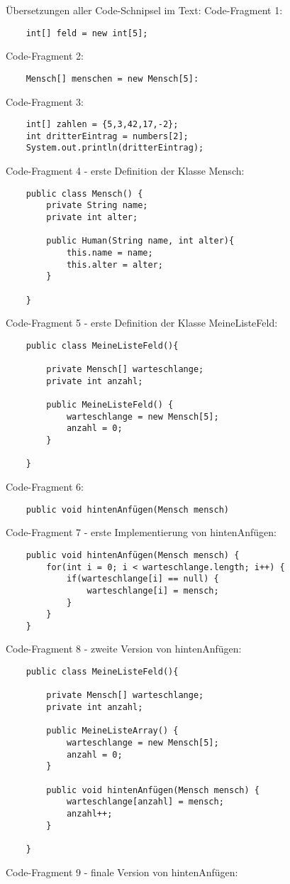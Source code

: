 \documentclass{article}
\begin{document}
Übersetzungen aller Code-Schnipsel im Text:
Code-Fragment 1:
\begin{verbatim}
    int[] feld = new int[5];
\end{verbatim}
Code-Fragment 2:
\begin{verbatim}
    Mensch[] menschen = new Mensch[5]:
\end{verbatim}
Code-Fragment 3:
\begin{verbatim}
    int[] zahlen = {5,3,42,17,-2};
    int dritterEintrag = numbers[2];
    System.out.println(dritterEintrag);
\end{verbatim}
Code-Fragment 4 - erste Definition der Klasse Mensch:
\begin{verbatim}
    public class Mensch() {
        private String name;
        private int alter; 
    
        public Human(String name, int alter){
            this.name = name;
            this.alter = alter;
        }
    
    }
\end{verbatim}
Code-Fragment 5 - erste Definition der Klasse MeineListeFeld:
\begin{verbatim}
    public class MeineListeFeld(){

        private Mensch[] warteschlange;
        private int anzahl;

        public MeineListeFeld() {
            warteschlange = new Mensch[5];
            anzahl = 0;
        }

    }
\end{verbatim}
Code-Fragment 6:
\begin{verbatim}
    public void hintenAnfügen(Mensch mensch) 
\end{verbatim}
Code-Fragment 7 - erste Implementierung von hintenAnfügen:
\begin{verbatim}
    public void hintenAnfügen(Mensch mensch) {
        for(int i = 0; i < warteschlange.length; i++) {
            if(warteschlange[i] == null) {
                warteschlange[i] = mensch;
            }
        }
    }
\end{verbatim}
Code-Fragment 8 - zweite Version von hintenAnfügen:
\begin{verbatim}
    public class MeineListeFeld(){

        private Mensch[] warteschlange;
        private int anzahl; 

        public MeineListeArray() {
            warteschlange = new Mensch[5];
            anzahl = 0;
        }

        public void hintenAnfügen(Mensch mensch) {
            warteschlange[anzahl] = mensch;
            anzahl++;
        }

    }
\end{verbatim}
Code-Fragment 9 - finale Version von hintenAnfügen: 
\end{document}
